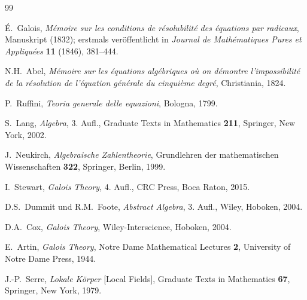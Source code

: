 \documentclass[12pt,a4paper]{amsart}
\theoremstyle{definition}
\begin{document}
\addtocounter{section}{-1}
\renewcommand{\thesection}{\Alph{section}}

\begin{thebibliography}{99}

\'{E}.~Galois,
\textit{Mémoire sur les conditions de résolubilit\'{e} des équations par
radicaux},
Manuskript (1832); erstmals veröffentlicht in \textit{Journal de
Math\'{e}matiques Pures et Appliqu\'{e}es} \textbf{11} (1846), 381--444.

N.H.~Abel,
\textit{Mémoire sur les équations algébriques où on démontre l'impossibilité
de la résolution de l'équation générale du cinquième degré},
Christiania, 1824.

P.~Ruffini,
\textit{Teoria generale delle equazioni},
Bologna, 1799.

S.~Lang,
\textit{Algebra}, 3. Aufl.,
Graduate Texts in Mathematics \textbf{211},
Springer, New York, 2002.

J.~Neukirch,
\textit{Algebraische Zahlentheorie},
Grundlehren der mathematischen Wissenschaften \textbf{322},
Springer, Berlin, 1999.

I.~Stewart,
\textit{Galois Theory}, 4. Aufl.,
CRC Press, Boca Raton, 2015.

D.S.~Dummit und R.M.~Foote,
\textit{Abstract Algebra}, 3. Aufl.,
Wiley, Hoboken, 2004.

D.A.~Cox,
\textit{Galois Theory},
Wiley-Interscience, Hoboken, 2004.

E.~Artin,
\textit{Galois Theory},
Notre Dame Mathematical Lectures \textbf{2},
University of Notre Dame Press, 1944.

J.-P.~Serre,
\textit{Lokale Körper} [Local Fields],
Graduate Texts in Mathematics \textbf{67},
Springer, New York, 1979.

\end{thebibliography}
\end{document}
